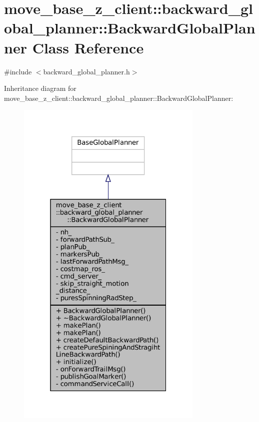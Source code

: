 \hypertarget{classmove__base__z__client_1_1backward__global__planner_1_1BackwardGlobalPlanner}{}\section{move\+\_\+base\+\_\+z\+\_\+client\+:\+:backward\+\_\+global\+\_\+planner\+:\+:Backward\+Global\+Planner Class Reference}
\label{classmove__base__z__client_1_1backward__global__planner_1_1BackwardGlobalPlanner}


{\ttfamily \#include $<$backward\+\_\+global\+\_\+planner.\+h$>$}



Inheritance diagram for move\+\_\+base\+\_\+z\+\_\+client\+:\+:backward\+\_\+global\+\_\+planner\+:\+:Backward\+Global\+Planner\+:
\nopagebreak
\begin{figure}[H]
\begin{center}
\leavevmode
\includegraphics[width=253pt]{classmove__base__z__client_1_1backward__global__planner_1_1BackwardGlobalPlanner__inherit__graph}
\end{center}
\end{figure}


